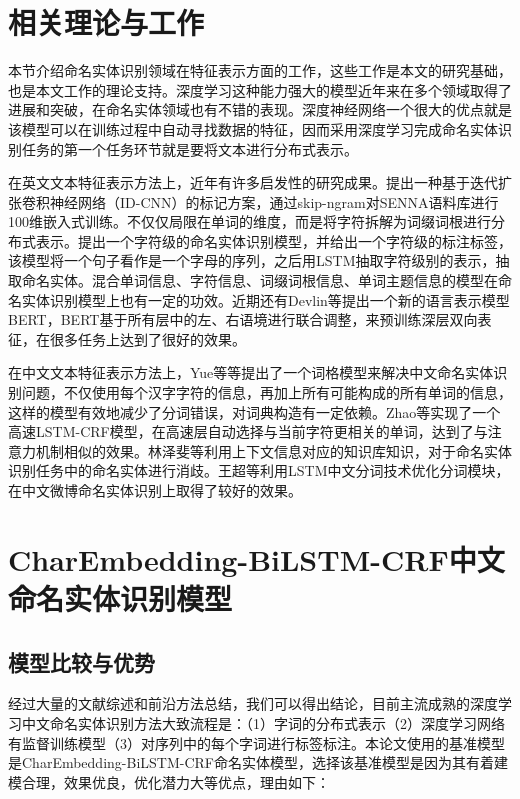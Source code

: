 \documentclass[winfonts,master,oneside,nobackinfo]{njuthesis}
\begin{document}
\section{相关理论与工作}

本节介绍命名实体识别领域在特征表示方面的工作，这些工作是本文的研究基础，也是本文工作的理论支持。深度学习这种能力强大的模型近年来在多个领域取得了进展和突破，在命名实体领域也有不错的表现。深度神经网络一个很大的优点就是该模型可以在训练过程中自动寻找数据的特征，因而采用深度学习完成命名实体识别任务的第一个任务环节就是要将文本进行分布式表示。

在英文文本特征表示方法上，近年有许多启发性的研究成果。\cite{Strubell}提出一种基于迭代扩张卷积神经网络（ID-CNN）的标记方案，通过skip-ngram对SENNA语料库进行100维嵌入式训练。\cite{JLi}不仅仅局限在单词的维度，而是将字符拆解为词缀词根进行分布式表示。\cite{Kuru}提出一个字符级的命名实体识别模型，并给出一个字符级的标注标签，该模型将一个句子看作是一个字母的序列，之后用LSTM抽取字符级别的表示，抽取命名实体。混合单词信息、字符信息、词缀词根信息、单词主题信息的模型\cite{Strubell}\cite{Wei}\cite{Jansson}在命名实体识别模型上也有一定的功效。近期还有Devlin等\cite{Devlin}提出一个新的语言表示模型BERT，BERT基于所有层中的左、右语境进行联合调整，来预训练深层双向表征，在很多任务上达到了很好的效果。

在中文文本特征表示方法上，Yue等\cite{Yue}等提出了一个词格模型来解决中文命名实体识别问题，不仅使用每个汉字字符的信息，再加上所有可能构成的所有单词的信息，这样的模型有效地减少了分词错误，对词典构造有一定依赖。Zhao等\cite{Zhao}实现了一个高速LSTM-CRF模型，在高速层自动选择与当前字符更相关的单词，达到了与注意力机制相似的效果。林泽斐等\cite{lzf}利用上下文信息对应的知识库知识，对于命名实体识别任务中的命名实体进行消歧。王超等\cite{Wang}利用LSTM中文分词技术优化分词模块，在中文微博命名实体识别上取得了较好的效果。

\section{CharEmbedding-BiLSTM-CRF中文命名实体识别模型}

\subsection{模型比较与优势}
经过大量的文献综述和前沿方法总结，我们可以得出结论，目前主流成熟的深度学习中文命名实体识别方法大致流程是：（1）字词的分布式表示（2）深度学习网络有监督训练模型（3）对序列中的每个字词进行标签标注。本论文使用的基准模型是CharEmbedding-BiLSTM-CRF命名实体模型，选择该基准模型是因为其有着建模合理，效果优良，优化潜力大等优点，理由如下：
\end{document}
